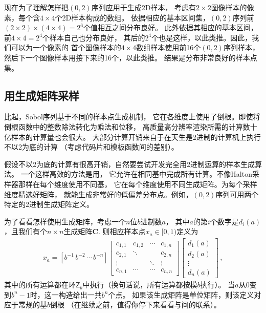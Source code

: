 现在为了理解怎样把$(0,2)$序列应用于生成2D样本，
考虑有$2\times2$图像样本的像素，每个含$4\times4$个2D样本构成的数组。
依据相应的基本区间集，$(0,2)$序列前$(2\times2)\times(4\times4)=2^6$个值相互之间分布良好。
此外依据其相应的基本区间，前$4\times4=2^4$个样本自己也分布良好，
其后的$2^4$个也是这样，以此类推。因此，我们可以为一个像素的
首个图像样本的$4\times4$数组样本使用前16个$(0,2)$序列样本，
然后下一个图像样本用接下来的16个，以此类推。
结果是分布非常良好的样本点集。

\subsection{用生成矩阵采样}\label{sub:用生成矩阵采样}
比起，Sobol序列基于不同的样本点生成机制，
它在各维度上使用了倒根。即使将倒根函数中的整数除法转化为乘法和位移，
高质量高分辨率渲染所需的计算数十亿样本的计算量也会很大。
大部分计算开销来自于在天生是2进制的计算机上执行不以2为底的计算
（考虑代码片和模板函数间的差别）。

假设不以2为底的计算有很高开销，自然要尝试开发完全用2进制运算的样本生成算法。
一个这样高效的方法是用，
它允许在相同基中完成所有计算。不像Halton采样器那样在每个维度使用不同基，
它在每个维度使用不同生成矩阵。为每个采样维度精选好矩阵，
就能生成非常好的低偏差分布点。例如，$(0,2)$序列可用两个特定的2进制生成矩阵定义。

为了看看怎样使用生成矩阵，考虑一个$n$位$b$进制数$a$，
其中$a$的第$i$个数字是$d_i(a)$，且我们有个$n\times n$生成矩阵$\bm C$.
则相应样本点$x_a\in[0,1)$定义为
\begin{align}\label{eq:7.9}
    x_a=[b^{-1}\,b^{-2}\, \cdots\,b^{-n}]\left[
        \begin{array}{cccc}
            c_{1,1} & c_{1,2} & \cdots & c_{1,n} \\
            c_{2,1} & \ddots  &        & c_{2,n} \\
            \vdots  &         & \ddots & \vdots  \\
            c_{n,1} & \cdots  & \cdots & c_{n,n}
        \end{array}
        \right]
    \left[
        \begin{array}{c}
            d_1(a) \\
            d_2(a) \\
            \vdots \\
            d_n(a)
        \end{array}
        \right]\, ,
\end{align}
其中的所有运算都在环$\mathsf{Z}_b$中执行（换句话说，所有运算都按模$b$执行）。
当$a$从0变到$b^n-1$时，这一构造给出一共$b^n$个点。
如果该生成矩阵是单位矩阵，则该定义对应于常规的基$b$倒根
（在继续之前，值得你停下来看看与间的联系）。

